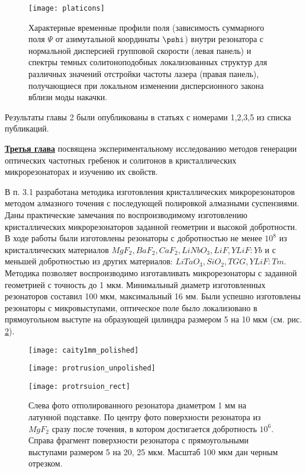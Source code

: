 \begin{figure}
  \centering
  \texttt{[image: platicons]}
  \caption{Характерные временные профили поля (зависимость суммарного поля $\Psi$ от азимутальной координаты $\pshi$) внутри резонатора с нормальной дисперсией групповой скорости (левая панель) и спектры темных солитоноподобных локализованных структур для различных значений отстройки частоты лазера (правая панель), получающиеся при локальном изменении дисперсионного закона вблизи моды накачки.}
  \label{platicons}
\end{figure}

Результаты главы 2 были опубликованы в статьях с номерами 1,2,3,5 из списка публикаций.

\underline{\textbf{Третья глава}} посвящена экспериментальному исследованию методов генерации оптических частотных гребенок и солитонов в кристаллических микрорезонаторах и изучению их свойств.

В п. 3.1 разработана методика изготовления кристаллических микрорезонаторов методом алмазного точения с последующей полировкой алмазными суспензиями. Даны практические замечания по воспроизводимому изготовлению кристаллических микрорезонаторов заданной геометрии и высокой добротности. В ходе работы были изготовлены резонаторы с добротностью не менее $10^8$ из кристаллических материалов $MgF_2,BaF_2,CaF_2,LiNbO_3,LiF,YLiF:Yb$ и с меньшей добротностью из других материалов: $LiTaO_3,SiO_2,TGG,YLiF:Tm$. Методика позволяет воспроизводимо изготавливать микрорезонаторы с заданной геометрией с точность до 1 мкм. Минимальный диаметр изготовленных резонаторов составил 100 мкм, максимальный 16 мм. Были успешно изготовлены резонаторы с микровыступами, оптическое поле было локализовано в прямоугольном выступе на образующей цилиндра размером 5 на 10 мкм (см. рис. \ref{cavity_polished}).

\begin{figure}[ht]
  \begin{minipage}[ht]{0.32\linewidth}\centering
    \texttt{[image: caity1mm\_polished]}
  \end{minipage}
  \hfill
  \begin{minipage}[ht]{0.32\linewidth}\centering
    \texttt{[image: protrusion\_unpolished]}
  \end{minipage}
  \hfill
  \begin{minipage}[ht]{0.32\linewidth}\centering
    \texttt{[image: protrsuion\_rect]}
  \end{minipage}
  \caption{Слева фото отполированного резонатора диаметром 1 мм на латунной подставке. По центру фото поверхности резонатора из $MgF_2$ сразу после точения, в котором достигается добротность $10^6$. Справа фрагмент поверхности резонатора с прямоугольными выступами размером 5 на 20, 25 мкм. Масштаб 100 мкм дан черным отрезком.}
  \label{cavity_polished}
\end{figure}


